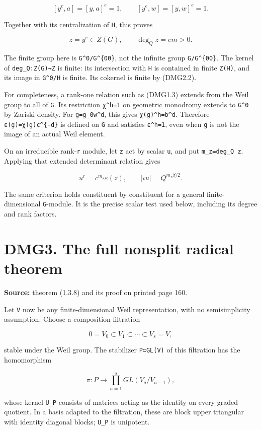 \documentclass[
]{report}
\begin{document}
\[
[y^e,a]=[y,a]^e=1,
\qquad [y^e,w]=[y,w]^e=1.
\]

Together with its centralization of \texttt{H}, this proves

\[
z=y^e\in Z(G),\qquad \deg_Q z=em>0.
\tag{DMG2.2}
\]

The finite group here is \texttt{G\^{}0/G\^{}\{00\}}, not the infinite
group \texttt{G/G\^{}\{00\}}. The kernel of \texttt{deg\_Q:Z(G)→Z} is
finite: its intersection with \texttt{H} is contained in finite
\texttt{Z(H)}, and its image in \texttt{G\^{}0/H} is finite. Its
cokernel is finite by (DMG2.2).

For completeness, a rank-one relation such as (DMG1.3) extends from the
Weil group to all of \texttt{G}. Its restriction \texttt{χ\^{}h=1} on
geometric monodromy extends to \texttt{G\^{}0} by Zariski density. For
\texttt{g=g\_0w\^{}d}, this gives \texttt{χ(g)\^{}h=b\^{}d}. Therefore
\texttt{ε(g)=χ(g)c\^{}\{-d\}} is defined on \texttt{G} and satisfies
\texttt{ε\^{}h=1}, even when \texttt{g} is not the image of an actual
Weil element.

On an irreducible rank-\texttt{r} module, let \texttt{z} act by scalar
\texttt{u}, and put \texttt{m\_z=deg\_Q\ z}. Applying that extended
determinant relation gives

\[
u^r=c^{m_z}\varepsilon(z),\qquad
|\iota u|=Q^{m_z\beta/2}.
\tag{DMG2.3}
\]

The same criterion holds constituent by constituent for a general
finite-dimensional \texttt{G}-module. It is the precise scalar test used
below, including its degree and rank factors.

\section{DMG3. The full nonsplit radical
theorem}\label{dmg3.-the-full-nonsplit-radical-theorem}

\textbf{Source:} theorem (1.3.8) and its proof on printed page 160.

Let \texttt{V} now be any finite-dimensional Weil representation, with
no semisimplicity assumption. Choose a composition filtration

\[
0=V_0\subset V_1\subset\cdots\subset V_s=V,
\]

stable under the Weil group. The stabilizer \texttt{P⊂GL(V)} of this
filtration has the homomorphism

\[
\pi:P\longrightarrow\prod_{a=1}^sGL(V_a/V_{a-1}),
\tag{DMG3.1}
\]

whose kernel \texttt{U\_P} consists of matrices acting as the identity
on every graded quotient. In a basis adapted to the filtration, these
are block upper triangular with identity diagonal blocks; \texttt{U\_P}
is unipotent.
\end{document}
